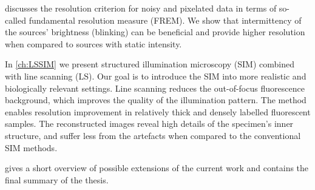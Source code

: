  discusses the resolution criterion for noisy and pixelated data in terms of so-called fundamental resolution measure (FREM). We show that intermittency of the sources' brightness (blinking) can be beneficial and provide higher resolution when compared to sources with static intensity. 

In \autoref{ch:LSSIM} we present structured illumination microscopy (SIM) combined with line scanning (LS). Our goal is to introduce the SIM into more realistic and biologically relevant settings. Line scanning reduces the out-of-focus fluorescence background, which improves the quality of the illumination pattern. The method enables resolution improvement in relatively thick and densely labelled fluorescent samples. The reconstructed images reveal high details of the specimen's inner structure, and suffer less from the artefacts when compared to the conventional SIM methods.  

 gives a short overview of possible extensions of the current work and contains the final summary of the thesis. 

